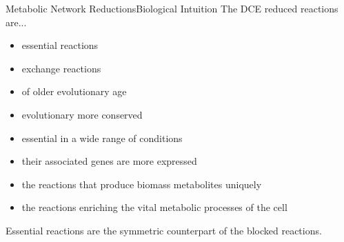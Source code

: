 \documentclass[10pt]{beamer}
\theoremstyle{remark}
\theoremstyle{definition}
\begin{document}
\begin{frame}{Metabolic Network Reductions}{Biological Intuition}
The DCE reduced reactions are...\pause
\begin{itemize}
	\item<2-> essential reactions
	\item<3-> exchange reactions
	\item<4-> of older evolutionary age 
	\item<5-> evolutionary more conserved 
	\item<6-> essential in a wide range of conditions
	\item<7-> their associated genes are more expressed
	\item<8-> the reactions that produce biomass metabolites uniquely
	\item<9-> the reactions enriching the vital metabolic processes of the cell
\end{itemize}

\begin{block}{}
Essential reactions are the symmetric counterpart of the blocked reactions.
\end{block}
\end{frame}

\end{document}
